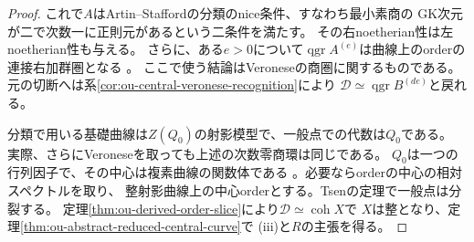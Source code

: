 \documentclass[11pt,a4paper]{ltjsarticle}
\theoremstyle{definition}
\newcommand{\qgr}{\operatorname{qgr}}
\newcommand{\coh}{\operatorname{coh}}
\begin{document}
\begin{proof}
これで$A$はArtin--Staffordの分類のnice条件、すなわち最小素商の
GK次元が二で次数一に正則元があるという二条件を満たす。
その右noetherian性は左noetherian性も与える。
さらに、ある$e>0$について$\qgr A^{(e)}$は曲線上のorderの
連接右加群圏となる\cite{ASsemiprime2000}
\cite[Corollary~6.4(i), Theorems~6.5,~6.6(i)]{StaffordVdB2001}。
ここで使う結論はVeroneseの商圏に関するものである。
元の切断へは系\ref{cor:ou-central-veronese-recognition}により
$\mathcal D\simeq\qgr B^{(de)}$と戻れる。

分類で用いる基礎曲線は$Z(Q_0)$の射影模型で、一般点での代数は$Q_0$である。
実際、さらにVeroneseを取っても上述の次数零商環は同じである。
$Q_0$は一つの行列因子で、その中心は複素曲線の関数体である
\cite[\S6]{StaffordVdB2001}。必要ならorderの中心の相対スペクトルを取り、
整射影曲線上の中心orderとする。Tsenの定理で一般点は分裂する。
定理\ref{thm:ou-derived-order-slice}により$\mathcal D\simeq\coh X$で
$X$は整となり、定理\ref{thm:ou-abstract-reduced-central-curve}で
(iii)と$R$の主張を得る。
\end{proof}
\end{document}
